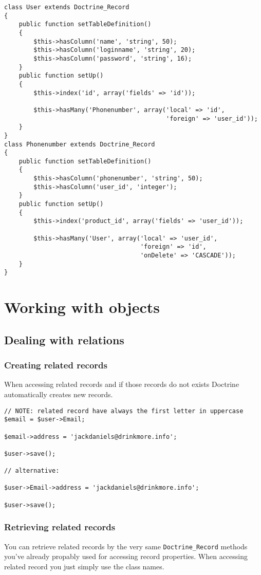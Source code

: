 \documentclass[11pt,a4paper]{report}
\begin{document}
\begin{verbatim}
class User extends Doctrine_Record
{
    public function setTableDefinition()
    {
        $this->hasColumn('name', 'string', 50);
        $this->hasColumn('loginname', 'string', 20);
        $this->hasColumn('password', 'string', 16);
    }
    public function setUp()
    {
        $this->index('id', array('fields' => 'id'));

        $this->hasMany('Phonenumber', array('local' => 'id',
                                            'foreign' => 'user_id'));
    }
}
class Phonenumber extends Doctrine_Record
{
    public function setTableDefinition()
    {
        $this->hasColumn('phonenumber', 'string', 50);
        $this->hasColumn('user_id', 'integer');
    }
    public function setUp()
    {
        $this->index('product_id', array('fields' => 'user_id'));

        $this->hasMany('User', array('local' => 'user_id',
                                     'foreign' => 'id',
                                     'onDelete' => 'CASCADE'));
    }
}
\end{verbatim}

\chapter{Working with objects}
\section{Dealing with relations}
\subsection{Creating related records}
When accessing related records and if those records do not exists Doctrine automatically creates new records.

\begin{verbatim}
// NOTE: related record have always the first letter in uppercase
$email = $user->Email;

$email->address = 'jackdaniels@drinkmore.info';

$user->save();

// alternative:

$user->Email->address = 'jackdaniels@drinkmore.info';

$user->save();
\end{verbatim}

\subsection{Retrieving related records}
You can retrieve related records by the very same \texttt{Doctrine\_Record} methods you've already propably used for accessing record properties. When accessing related record you just simply use the class names.
\end{document}
